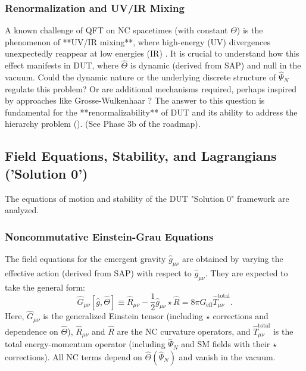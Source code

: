 \documentclass[11pt, a4paper]{article}
\theoremstyle{remark}
\newcommand{\Op}[1]{\hat{#1}}
\newcommand{\Star}{\star}
\begin{document}
\subsubsection{Renormalization and UV/IR Mixing}
\label{ssubsec:renormalization_final}
A known challenge of QFT on NC spacetimes (with constant \( \Theta \)) is the phenomenon of **UV/IR mixing**, where high-energy (UV) divergences unexpectedly reappear at low energies (IR) \citep{Minwalla:1999px, Hayakawa:1999yt}. It is crucial to understand how this effect manifests in DUT, where \( \Op{\Theta} \) is dynamic (derived from SAP) and null in the vacuum. Could the dynamic nature or the underlying discrete structure of \( \Op{\Psi}_N \) regulate this problem? Or are additional mechanisms required, perhaps inspired by approaches like Grosse-Wulkenhaar \citep{GrosseWulkenhaar2005}? The answer to this question is fundamental for the **renormalizability** of DUT and its ability to address the hierarchy problem (). (See Phase 3b of the roadmap).

\subsection{Field Equations, Stability, and Lagrangians ('Solution 0')}
\label{subsec:field_eqs_stability_final}

The equations of motion and stability of the DUT "Solution 0" framework are analyzed.

\subsubsection{Noncommutative Einstein-Grau Equations}
\label{ssubsec:einstein_grau_nc_final}
The field equations for the emergent gravity \( \Op{g}_{\mu\nu} \) are obtained by varying the effective action (derived from SAP) with respect to \( \Op{g}_{\mu\nu} \). They are expected to take the general form:
\begin{equation}\label{eq:einstein_grau_op_final}
\Op{G}_{\mu\nu}[\Op{g}, \Op{\Theta}] \equiv \Op{R}_{\mu\nu} - \frac{1}{2} \Op{g}_{\mu\nu} \Star \Op{R} = 8\pi G_{\text{eff}} \Op{T}_{\mu\nu}^{\text{total}}.
\end{equation}
Here, \( \Op{G}_{\mu\nu} \) is the generalized Einstein tensor (including \( \star \) corrections and dependence on \( \Op{\Theta} \)), \( \Op{R}_{\mu\nu} \) and \( \Op{R} \) are the NC curvature operators, and \( \Op{T}_{\mu\nu}^{\text{total}} \) is the total energy-momentum operator (including \( \Op{\Psi}_N \) and SM fields with their \( \star \) corrections). All NC terms depend on \( \Op{\Theta}(\Op{\Psi}_N) \) and vanish in the vacuum.
\end{document}
